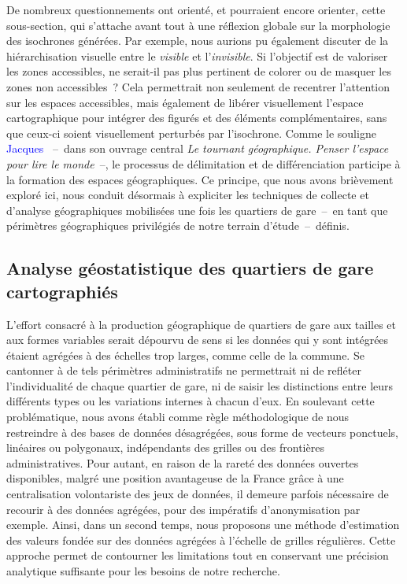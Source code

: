 \begin{refsegment}
De nombreux questionnements ont orienté, et pourraient encore orienter, cette sous-section, qui s’attache avant tout à une réflexion globale sur la morphologie des isochrones générées. Par exemple, nous aurions pu également discuter de la hiérarchisation visuelle entre le \textsl{visible} et l’\textsl{invisible}. Si l’objectif est de valoriser les zones accessibles, ne serait-il pas plus pertinent de colorer ou de masquer les zones non accessibles~? Cela permettrait non seulement de recentrer l’attention sur les espaces accessibles, mais également de libérer visuellement l’espace cartographique pour intégrer des figurés et des éléments complémentaires, sans que ceux-ci soient visuellement perturbés par l’isochrone. Comme le souligne \textcolor{blue}{Jacques} \textcolor{blue}{\textcite[5]{levy_tournant_1999}}~–~dans son ouvrage central \textsl{Le tournant géographique. Penser l'espace pour lire le monde}~–, le processus de délimitation et de différenciation participe à la formation des espaces géographiques. Ce principe, que nous avons brièvement exploré ici, nous conduit désormais à expliciter les techniques de collecte et d’analyse géographiques mobilisées une fois les quartiers de gare~–~en tant que périmètres géographiques privilégiés de notre terrain d'étude~–~définis.%

\subsection{Analyse géostatistique des quartiers de gare cartographiés
    \label{chap3:quartiers-gare-analyse-geostatistique}
    }

L'effort consacré à la production géographique de quartiers de gare aux tailles et aux formes variables serait dépourvu de sens si les données qui y sont intégrées étaient agrégées à des échelles trop larges, comme celle de la commune. Se cantonner à de tels périmètres administratifs ne permettrait ni de refléter l’individualité de chaque quartier de gare, ni de saisir les distinctions entre leurs différents types ou les variations internes à chacun d’eux. En soulevant cette problématique, nous avons établi comme règle méthodologique de nous restreindre à des bases de données désagrégées, sous forme de vecteurs ponctuels, linéaires ou polygonaux, indépendants des grilles ou des frontières administratives. Pour autant, en raison de la rareté des données ouvertes disponibles, malgré une position avantageuse de la France grâce à une centralisation volontariste des jeux de données, il demeure parfois nécessaire de recourir à des données agrégées, pour des impératifs d'anonymisation par exemple. Ainsi, dans un second temps, nous proposons une méthode d’estimation des valeurs fondée sur des données agrégées à l’échelle de grilles régulières. Cette approche permet de contourner les limitations tout en conservant une précision analytique suffisante pour les besoins de notre recherche.%


\end{refsegment}
